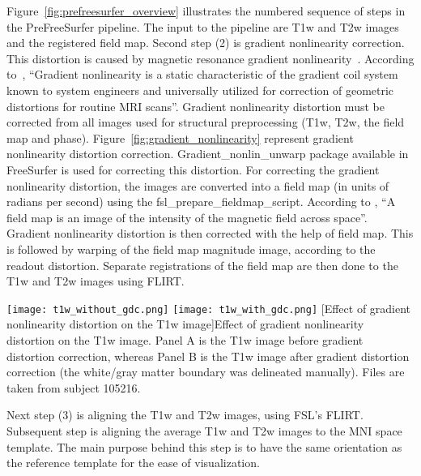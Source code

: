 \indent Figure~\ref{fig:prefreesurfer_overview} illustrates the 
numbered sequence of steps in the PreFreeSurfer pipeline. The input to 
the pipeline are T1w and T2w images and the registered field map. 
Second step (2) is gradient nonlinearity correction. This distortion is 
caused by magnetic resonance gradient nonlinearity~\cite{Gla13}. 
According to~\cite{Zou2004}, ``Gradient nonlinearity is a static 
characteristic of the gradient coil system known to system engineers 
and universally utilized for correction of geometric distortions for 
routine MRI scans''. Gradient nonlinearity distortion must be corrected 
from all images used for structural preprocessing (T1w, T2w, the field 
map and phase). Figure~\ref{fig:gradient_nonlinearity} represent 
gradient nonlinearity distortion correction. Gradient\_nonlin\_unwarp 
package available in FreeSurfer is used for correcting this distortion. 
For correcting the gradient nonlinearity distortion, the images are 
converted into a field map (in units of radians per second) using the 
fsl\_prepare\_fieldmap\_script. According to \cite{field_map}, ``A 
field map is an image of the intensity of the magnetic field across 
space''. Gradient nonlinearity distortion is then corrected with the 
help of field map. This is followed by warping of the field map 
magnitude image, according to the readout distortion. Separate 
registrations of the field map are then done to the T1w and T2w images 
using FLIRT.

\begin{center}
  \texttt{[image: t1w\_without\_gdc.png]}%
  \texttt{[image: t1w\_with\_gdc.png]}
  [Effect of gradient nonlinearity distortion on the T1w image]{Effect of gradient nonlinearity distortion on the T1w image. Panel A is the T1w image before gradient distortion correction, whereas Panel B is the T1w image after gradient distortion correction (the white/gray matter boundary was delineated manually). Files are taken from subject 105216.}
  \label{fig:gradient_nonlinearity}
\end{center}

\indent Next step (3) is aligning the T1w and T2w images, using FSL's FLIRT. Subsequent step is aligning the average T1w and T2w images to the MNI space template. The main purpose behind this step is to have the same orientation as the reference template for the ease of visualization.

